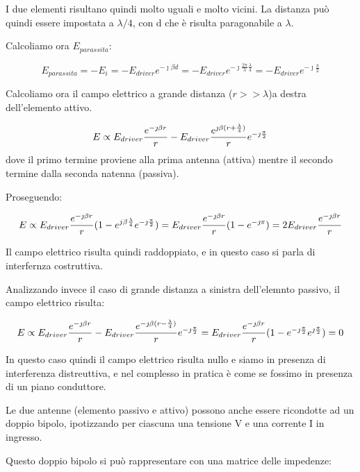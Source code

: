 I due elementi risultano quindi molto uguali e	molto vicini.
La distanza può quindi essere impostata a $\lambda/4$, con d che è risulta paragonabile a $\lambda$.

Calcoliamo ora $E_{parassita}$:

\begin{equation}
E_{parassita} = -E_i = -E_{driver} e^{-\jmath \beta d} = -E_{driver} e^{-\jmath \frac{2 \pi}{\lambda} \frac{\lambda}{4}} = -E_{driver} e^{-\jmath \frac{\pi}{2}}
\end{equation}

Calcoliamo ora il campo elettrico a grande distanza ($r>>\lambda$)a destra dell'elemento attivo.

\begin{equation}
E \propto E_{driver}\frac{e^{-\jmath \beta r}}{r}-E_{driver}\frac{e^{\jmath\beta(r+\frac{\lambda}{4})}}{r}e^{-\jmath\frac{\pi}{2}}
\end{equation}
dove il primo termine proviene alla prima antenna (attiva) mentre il secondo termine dalla seconda natenna (passiva).

Proseguendo:

\begin{equation}
E \propto E_{driver}\frac{e^{-\jmath \beta r}}{r} (1-e^{j\beta\frac{\lambda}{4}}e^{-\jmath\frac{\pi}{2}}) =	 E_{driver}\frac{e^{-\jmath \beta r}}{r} (1-e^{-\jmath\pi}) = 2E_{driver}\frac{e^{-\jmath \beta r}}{r}
\end{equation}

Il campo elettrico risulta quindi raddoppiato, e in questo caso si parla di interfernza costruttiva.

Analizzando invece il caso di grande distanza a sinistra dell'elemnto passivo, il campo elettrico risulta:

\begin{equation}
E \propto E_{driver}\frac{e^{-\jmath \beta r}}{r}-E_{driver}\frac{e^{-\jmath\beta(r-\frac{\lambda}{4})}}{r}e^{-\jmath\frac{\pi}{2}} =	 E_{driver}\frac{e^{-\jmath \beta r}}{r} (1-e^{-\jmath\frac{\pi}{2}}e^{\jmath\frac{\pi}{2}}) = 0
\end{equation}

In questo caso quindi il campo elettrico risulta nullo e siamo in presenza di interferenza distreuttiva, e nel complesso in pratica è come se fossimo in presenza di un piano conduttore.

Le due antenne (elemento passivo e attivo) possono anche essere ricondotte ad un doppio bipolo, ipotizzando per ciascuna una tensione V	 e una corrente I in ingresso.

Questo doppio bipolo si può rappresentare con una matrice delle impedenze:


